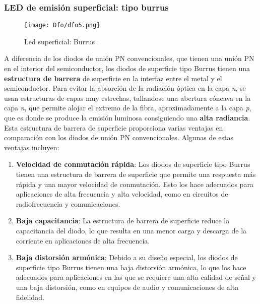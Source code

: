 \documentclass[12pt,fleqn,a4paper,oneside]{LegrandOrangeBook}
\begin{document}
\subsubsection*{LED de emisión superficial: tipo burrus}
\begin{figure}[H]
\centering
\texttt{[image: Dfo/dfo5.png]}
\caption{Led superficial: Burrus .}
\end{figure}
A diferencia de los diodos de unión PN convencionales, que tienen una unión PN en el interior del semiconductor, los diodos de superficie tipo Burrus tienen una \textbf{estructura de barrera} de superficie en la interfaz entre el metal y el semiconductor. Para evitar la absorción de la radiación óptica en la capa \textit{n}, se usan estructuras de capas muy estrechas, tallandose una abertura cóncava en la capa \textit{n}, que permite alojar el extremo de la fibra, aproximadamente a la capa \textit{p}, que es donde se produce la emisión luminosa consiguiendo una \textbf{alta radiancia}.\\
Esta estructura de barrera de superficie proporciona varias ventajas en comparación con los diodos de unión PN convencionales. Algunas de estas ventajas incluyen:
\begin{enumerate}
\item \textbf{Velocidad de conmutación rápida}: Los diodos de superficie tipo Burrus tienen una estructura de barrera de superficie que permite una respuesta más rápida y una mayor velocidad de conmutación. Esto los hace adecuados para aplicaciones de alta frecuencia y alta velocidad, como en circuitos de radiofrecuencia y comunicaciones.
\item \textbf{Baja capacitancia}: La estructura de barrera de superficie reduce la capacitancia del diodo, lo que resulta en una menor carga y descarga de la corriente en aplicaciones de alta frecuencia.
\item \textbf{Baja distorsión armónica}: Debido a su diseño especial, los diodos de superficie tipo Burrus tienen una baja distorsión armónica, lo que los hace adecuados para aplicaciones en las que se requiere una alta calidad de señal y una baja distorsión, como en equipos de audio y comunicaciones de alta fidelidad.
\end{enumerate}
\end{document}
